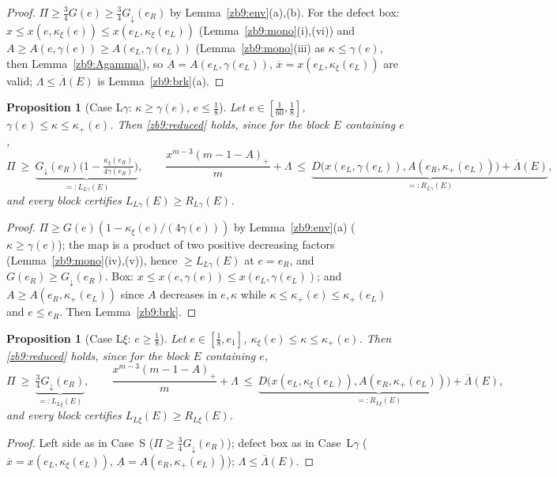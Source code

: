 \documentclass[11pt]{amsart}
\newtheorem{proposition}[theorem]{Proposition}
\newcommand{\kxi}{\kappa_\xi}
\newcommand{\khi}{\kappa_{+}}
\begin{document}
\begin{proof}
$\Pi\ge\tfrac34G(e)\ge\tfrac34G_\downarrow(e_R)$ by
Lemma~\ref{zb9:env}(a),(b).  For the defect box:
$x\le x(e,\kxi(e))\le x(e_L,\kxi(e_L))$ (Lemma~\ref{zb9:mono}(i),(vi)) and
$A\ge A(e,\gamma(e))\ge A(e_L,\gamma(e_L))$ (Lemma~\ref{zb9:mono}(iii) as
$\kappa\le\gamma(e)$, then Lemma~\ref{zb9:Agamma}), so
$\underline A=A(e_L,\gamma(e_L))$, $\overline x=x(e_L,\kxi(e_L))$ are valid;
$\Lambda\le\overline\Lambda(E)$ is Lemma~\ref{zb9:brk}(a).
\end{proof}

\begin{proposition}[Case L$\gamma$: $\kappa\ge\gamma(e)$, $e\le\tfrac18$]\label{zb9:caseLg}
Let $e\in[\tfrac1{60},\tfrac18]$, $\gamma(e)\le\kappa\le\khi(e)$.  Then
\eqref{zb9:reduced} holds, since for the block $E$ containing $e$,
\[
 \Pi\ \ge\ \underbrace{G_\downarrow(e_R)\bigl(1-\tfrac{\kxi(e_R)}{4\gamma(e_R)}\bigr)}_{=:L_{L\gamma}(E)},\qquad
 \frac{x^{m-3}(m-1-A)_+}{m}+\Lambda\ \le\
 \underbrace{D\bigl(x(e_L,\gamma(e_L)),A(e_R,\khi(e_L))\bigr)+\overline\Lambda(E)}_{=:R_{L\gamma}(E)},
\]
and every block certifies $L_{L\gamma}(E)\ge R_{L\gamma}(E)$.
\end{proposition}

\begin{proof}
$\Pi\ge G(e)(1-\kxi(e)/(4\gamma(e)))$ by Lemma~\ref{zb9:env}(a)
($\kappa\ge\gamma(e)$); the map is a product of two positive decreasing factors
(Lemma~\ref{zb9:mono}(iv),(v)), hence $\ge L_{L\gamma}(E)$ at $e=e_R$, and
$G(e_R)\ge G_\downarrow(e_R)$.  Box: $x\le x(e,\gamma(e))\le x(e_L,\gamma(e_L))$;
and $A\ge A(e_R,\khi(e_L))$ since $A$ decreases in $e,\kappa$ while
$\kappa\le\khi(e)\le\khi(e_L)$ and $e\le e_R$.  Then Lemma~\ref{zb9:brk}.
\end{proof}

\begin{proposition}[Case L$\xi$: $e\ge\tfrac18$]\label{zb9:caseLx}
Let $e\in[\tfrac18,e_1]$, $\kxi(e)\le\kappa\le\khi(e)$.  Then
\eqref{zb9:reduced} holds, since for the block $E$ containing $e$,
\[
 \Pi\ \ge\ \underbrace{\tfrac34 G_\downarrow(e_R)}_{=:L_{L\xi}(E)},\qquad
 \frac{x^{m-3}(m-1-A)_+}{m}+\Lambda\ \le\
 \underbrace{D\bigl(x(e_L,\kxi(e_L)),A(e_R,\khi(e_L))\bigr)+\overline\Lambda(E)}_{=:R_{L\xi}(E)},
\]
and every block certifies $L_{L\xi}(E)\ge R_{L\xi}(E)$.
\end{proposition}

\begin{proof}
Left side as in Case~S ($\Pi\ge\tfrac34G_\downarrow(e_R)$); defect box as in
Case~L$\gamma$ ($\overline x=x(e_L,\kxi(e_L))$, $\underline A=A(e_R,\khi(e_L))$);
$\Lambda\le\overline\Lambda(E)$.
\end{proof}
\end{document}

